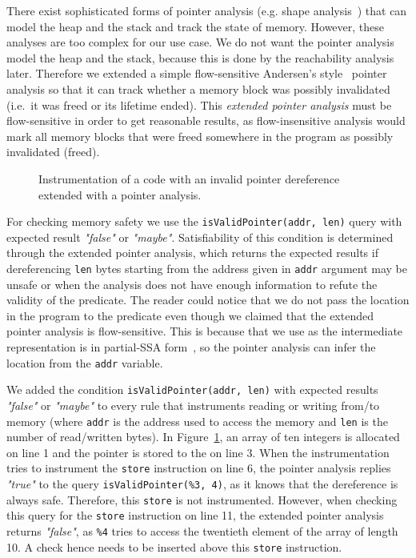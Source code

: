 There exist sophisticated forms of pointer analysis (e.g. shape
analysis~\cite{Rinetzky2001,Hind01}) that can model the heap and the
stack and track the state of memory.  However, these analyses are too
complex for our use case. We do not want the pointer analysis model
the heap and the stack, because this is done by the reachability
analysis later.  Therefore we extended a simple flow-sensitive
Andersen's style~\cite{and94} pointer analysis so that it can track
whether a memory block was possibly invalidated (i.e.~it was freed or
its lifetime ended).  This \emph{extended pointer analysis} must be
flow-sensitive in order to get reasonable results, as flow-insensitive
analysis would mark all memory blocks that were freed somewhere in the
program as possibly invalidated (freed).

\begin{figure}[t]

\caption{Instrumentation of a code with an invalid pointer
  dereference extended with a pointer analysis.}
\label{fig:examplepta}
\end{figure}

For checking memory safety we use the \texttt{isValidPointer(addr, len)} query
with expected result \emph{"false"} or \emph{"maybe"}. Satisfiability of this
condition is determined through the extended pointer analysis, which returns
the expected results if dereferencing \texttt{len} bytes starting from the
address given in \texttt{addr} argument may be unsafe or when the analysis does
not have enough information to refute the validity of the predicate.  The
reader could notice that we do not pass the location in the program to the
predicate even though we claimed that the extended pointer analysis is
flow-sensitive. This is because \llvm that we use as the intermediate
representation is in partial-SSA form~\cite{Lattner04}, so the pointer analysis
can infer the location from the \texttt{addr} variable.

We added the condition \texttt{isValidPointer(addr, len)} with expected results
\emph{"false"} or \emph{"maybe"} to every rule that instruments reading or
writing from/to memory (where \texttt{addr} is the address used to access the
memory and \texttt{len} is the number of read/written bytes). In
Figure~\ref{fig:examplepta}, an array of ten integers is allocated on line 1
and the pointer is stored to the \stacklist on line 3.  When the
instrumentation tries to instrument the \texttt{store} instruction on line 6,
the pointer analysis replies \emph{"true"} to the query
\texttt{isValidPointer(\%3, 4)}, as it knows that the dereference is always
safe. Therefore, this \texttt{store} is not instrumented. However, when
checking this query for the \texttt{store} instruction on line 11, the extended
pointer analysis returns \emph{"false"}, as \texttt{\%4} tries to access the
twentieth element of the array of length 10. A check hence needs to be inserted
above this \texttt{store} instruction.

